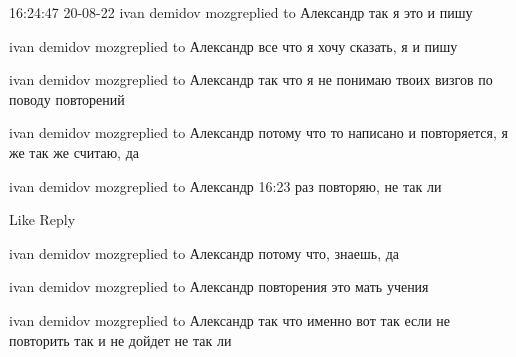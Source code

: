  
 
 
 
 

16:24:47 20-08-22
ivan demidov mozgreplied to Александр
так я это и пишу

ivan demidov mozgreplied to Александр
все что я хочу сказать, я и пишу

ivan demidov mozgreplied to Александр
так что я не понимаю твоих визгов по поводу повторений

ivan demidov mozgreplied to Александр
потому что то написано и повторяется, я же так же считаю, да

ivan demidov mozgreplied to Александр
16:23
раз повторяю, не так ли

    Like
    Reply

ivan demidov mozgreplied to Александр
потому что, знаешь, да

ivan demidov mozgreplied to Александр
повторения это мать учения

ivan demidov mozgreplied to Александр
так что именно вот так если не повторить так и не дойдет не так ли

